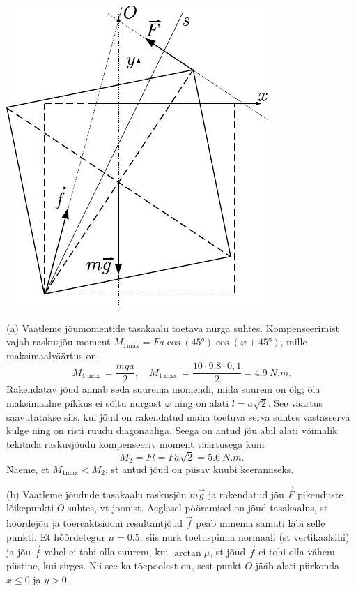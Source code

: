 \documentclass[10pt]{article}
\begin{document}
{\begin{center}
	\includegraphics[height=0.6\textheight]{2007-v2g-09-lah}
\end{center}

(a) Vaatleme jõumomentide tasakaalu toetava nurga suhtes. Kompenseerimist vajab raskusjõu moment $M_{1 \mathrm{max}} = F a \cos (\ang{45}) \cos (\varphi + \ang{45})$, mille maksimaalväärtus on 
\[
M_{1 \max }=\frac{m g a}{2}, \quad M_{1 \max }=\frac{10 \cdot \num{9,8} \cdot 0,1}{2}=\SI{4,9}{N.m}.
\]
Rakendatav jõud annab seda suurema momendi, mida suurem on õlg; õla maksimaalne pikkus ei sõltu nurgast $\varphi$ ning on alati $l = a \sqrt 2$. See väärtus saavutatakse siis, kui jõud on rakendatud maha toetuva serva suhtes vastasserva külge ning on risti ruudu diagonaaliga. Seega on antud jõu abil alati võimalik tekitada raskusjõudu kompenseeriv moment väärtusega kuni
\[
M_{2}=F l=F a \sqrt{2} = \SI{5.6}{N.m}.
\]
Näeme, et $M_{1 \mathrm{max}} < M_2$, st antud jõud on piisav kuubi keeramiseks.


(b) Vaatleme jõudude tasakaalu raskusjõu $m\vec g$ ja rakendatud jõu $\vec F$ pikenduste lõikepunkti $O$ suhtes, vt joonist. Aeglasel pööramisel on jõud tasakaalus, st hõõrdejõu ja toereaktsiooni resultantjõud $\vec f$ peab minema samuti läbi selle punkti. Et hõõrdetegur $\mu = \num{0,5}$, siis nurk toetuspinna normaali (st vertikaalsihi) ja jõu $\vec f$ vahel ei tohi olla suurem, kui $\arctan \mu$, st jõud $\vec f$ ei tohi olla vähem püstine, kui sirges. Nii see ka tõepoolest on, sest punkt $O$ jääb alati piirkonda $x \leq 0$ ja $y > 0$. 

}
\end{document}

